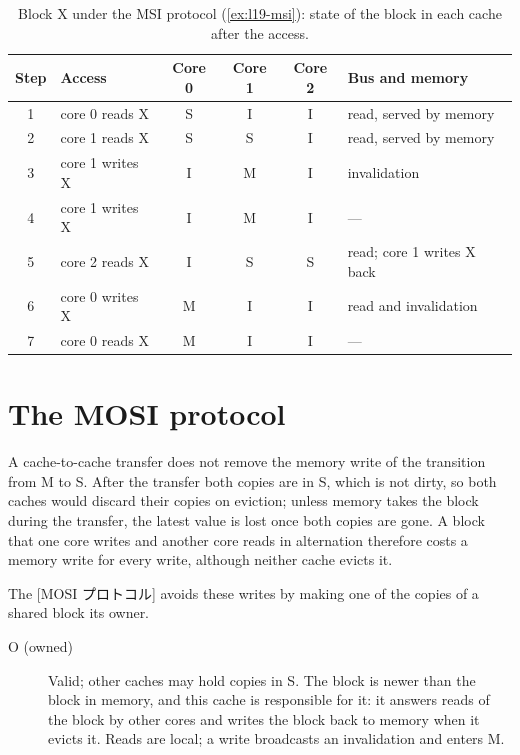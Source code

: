 \documentclass[../main.tex]{subfiles}
\begin{document}
\begin{table}[htbp]
  \centering\small
  \caption{Block X under the MSI protocol (\cref{ex:l19-msi}): state of the
    block in each cache after the access.}
  \label{tab:l19-msi}
  \begin{tabular}{@{}cl ccc l@{}}
    \toprule
    Step & Access & Core 0 & Core 1 & Core 2 & Bus and memory \\
    \midrule
    1 & core 0 reads X  & S & I & I & read, served by memory \\
    2 & core 1 reads X  & S & S & I & read, served by memory \\
    3 & core 1 writes X & I & M & I & invalidation \\
    4 & core 1 writes X & I & M & I & --- \\
    5 & core 2 reads X  & I & S & S & read; core 1 writes X back \\
    6 & core 0 writes X & M & I & I & read and invalidation \\
    7 & core 0 reads X  & M & I & I & --- \\
    \bottomrule
  \end{tabular}
\end{table}

\section{The MOSI protocol}
\label{sec:l19-mosi}

A cache-to-cache transfer does not remove the memory write of the transition
from M to S.  After the transfer both
copies are in S, which is not dirty, so both caches would discard their
copies on eviction; unless memory takes the block during the transfer, the
latest value is lost once both copies are gone.  A block that one core writes
and another core reads in alternation therefore costs a memory write for
every write, although neither cache evicts it.

The [MOSI プロトコル] avoids these writes by making one
of the copies of a shared block its owner.
\begin{description}
  \item[O (owned)] Valid; other caches may hold copies in S.  The block is
    newer than the block in memory, and this cache is responsible for it: it
    answers reads of the block by other cores and writes the block back to
    memory when it evicts it.  Reads are local; a write broadcasts an
    invalidation and enters M.
\end{description}
\end{document}

